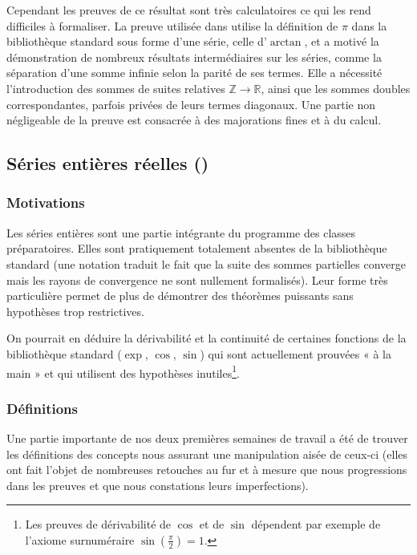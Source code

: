 Cependant les preuves de ce résultat sont très calculatoires ce qui les rend difficiles à formaliser. La preuve utilisée dans  utilise la définition de $\pi$ dans la bibliothèque standard sous forme d'une série, celle d'$\arctan$, et a motivé la démonstration de nombreux résultats intermédiaires sur les séries, comme la séparation d'une somme infinie selon la parité de ses termes. Elle a nécessité l'introduction des sommes de suites relatives $\mathbb{Z}\rightarrow\mathbb{R}$, ainsi que les sommes doubles correspondantes, parfois privées de leurs termes diagonaux. Une partie non négligeable de la preuve est consacrée à des majorations fines et à du calcul.

\subsection{Séries entières réelles ()}

\subsubsection{Motivations}

Les séries entières sont une partie intégrante du programme des classes préparatoires. Elles sont pratiquement totalement absentes de la bibliothèque standard (une notation  traduit le fait que la suite des sommes partielles converge mais les rayons de convergence ne sont nullement formalisés). Leur forme très particulière permet de plus de démontrer des théorèmes puissants sans hypothèses trop restrictives.

On pourrait en déduire la dérivabilité et la continuité de certaines fonctions de la bibliothèque standard ($\exp$, $\cos$, $\sin$) qui sont actuellement prouvées « à la main » et qui utilisent des hypothèses inutiles\footnote{Les preuves de dérivabilité de $\cos$ et de $\sin$ dépendent par exemple de l'axiome surnuméraire $\sin\left(\frac{\pi}{2}\right) = 1$.}.

\subsubsection{Définitions}

Une partie importante de nos deux premières semaines de travail a été de trouver les définitions des concepts nous assurant une manipulation aisée de ceux-ci (elles ont fait l'objet de nombreuses retouches au fur et à mesure que nous progressions dans les preuves et que nous constations leurs imperfections).

